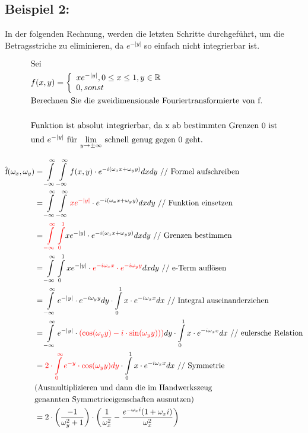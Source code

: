 \documentclass[11pt,final]{scrreprt}
\newcommand{\R} {\mathbb R}
\begin{document}
\subsection*{Beispiel 2:}

In der folgenden Rechnung, werden die letzten Schritte durchgeführt, um die Betragsstriche zu eliminieren, da $ e^{-|y|} $ so einfach nicht integrierbar ist. 

\begin{align*}
&\text{Sei}\\
&f(x,y) = \left\{
\begin{array}{l}
xe^{-|y|}, 0\leq x\leq 1,  y\in \R \\ 
0, sonst
\end{array}
\right.\\
&\text{Berechnen Sie die zweidimensionale Fouriertransformierte von f.}\\\\
&\text{Funktion ist absolut integrierbar, da x ab bestimmten Grenzen 0 ist}\\
&\text{und $e^{-|y|}$ für $ \lim_{y\to\pm\infty} $ schnell genug gegen 0 geht.}
\end{align*}

\begin{align*}
\text{\^{f}}(\omega_x, \omega_y) &= \int\limits_{-\infty}^{\infty}\int\limits_{-\infty}^{\infty} f(x, y) \cdot e^{-i(\omega_x x + \omega_y y)} dx dy \text{  //  Formel aufschreiben} \\
&= \int\limits_{-\infty}^{\infty}\int\limits_{-\infty}^{\infty} \textcolor{red}{xe^{-|y|}} \cdot e^{-i(\omega_x x + \omega_y y)} dx dy \text{  //  Funktion einsetzen} \\
&= \textcolor{red}{\int\limits_{-\infty}^{\infty}\int\limits_{0}^{1}} xe^{-|y|} \cdot e^{-i(\omega_x x + \omega_y y)} dx dy \text{  //  Grenzen bestimmen} \\
&= \int\limits_{-\infty}^{\infty}\int\limits_{0}^{1} xe^{-|y|} \cdot \textcolor{red}{e^{-i\omega_x x} \cdot e^{-i\omega_y y}} dx dy \text{  //  e-Term auflösen} \\
&= \int\limits_{-\infty}^{\infty} e^{-|y|} \cdot e^{-i\omega_y y} dy \cdot \int\limits_{0}^{1} x \cdot e^{-i\omega_x x} dx  \text{  //  Integral auseinanderziehen} \\
&= \int\limits_{-\infty}^{\infty} e^{-|y|} \cdot \textcolor{red}{\left( \cos(\omega_y y) - i \cdot \sin(\omega_y y)) \right)} dy \cdot \int\limits_{0}^{1} x \cdot e^{-i\omega_x x} dx  \text{  //  eulersche Relation} \\
&= \textcolor{red}{2 \cdot \int\limits_{0}^{\infty} e^{-y} \cdot \cos(\omega_y y) dy} \cdot \int\limits_{0}^{1} x \cdot e^{-i\omega_x x} dx  \text{  //  Symmetrie} \\
&\text{(Ausmultiplizieren und dann die im Handwerkszeug}\\&\text{genannten Symmetrieeigenschaften ausnutzen)}\\
&= 2 \cdot \left(\dfrac{-1}{\omega_{y}^2+1}\right) \cdot \left(\dfrac{1}{\omega_{x}^2} - \dfrac{e^{-\omega_x i}(1 + \omega_x i)}{\omega_{x}^2} \right)
\end{align*}
\end{document}

